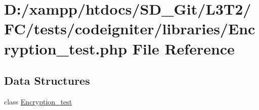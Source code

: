 \hypertarget{_encryption__test_8php}{}\section{D\+:/xampp/htdocs/\+S\+D\+\_\+\+Git/\+L3\+T2/\+F\+C/tests/codeigniter/libraries/\+Encryption\+\_\+test.php File Reference}
\label{_encryption__test_8php}
\subsection*{Data Structures}
\begin{DoxyCompactItemize}
\item 
class \hyperlink{class_encryption__test}{Encryption\+\_\+test}
\end{DoxyCompactItemize}
